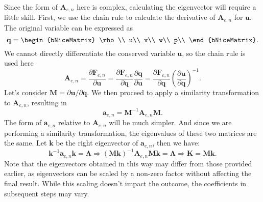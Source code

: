 \documentclass{develop-note}
\begin{document}
Since the form of $\mathbf{A}_{e,n}$ here is complex, calculating the eigenvector will require a little skill. First, we use the chain rule to calculate the derivative of $\mathbf{A}_{e,n}$ for $\mathbf{u}$. The original variable can be expressed as
\begin{equation}
  \mathbf{q}=\begin{bNiceMatrix}
    \rho\\
    u\\
    v\\
    w\\
    p\\
  \end{bNiceMatrix}.
\end{equation}
We cannot directly differentiate the conserved variable $\mathbf{u}$, so the chain rule is used here
\begin{equation}
  \mathbf{A}_{e,n}=\dfrac{\partial\mathbf{F}_{e,n}}{\partial\mathbf{u}}=\dfrac{\partial\mathbf{F}_{e,n}}{\partial\mathbf{q}}\dfrac{\partial\mathbf{q}}{\partial\mathbf{u}}=\dfrac{\partial\mathbf{F}_{e,n}}{\partial\mathbf{q}}\left(\dfrac{\partial\mathbf{u}}{\partial\mathbf{q}}\right)^{-1}.
\end{equation}
Let's consider $\mathbf{M}=\partial\mathbf{u}/\partial\mathbf{q}$. We then proceed to apply a similarity transformation to $\mathbf{A}_{e,n}$, resulting in
\begin{equation}
  \mathbf{a}_{e,n}=\mathbf{M}^{-1}\mathbf{A}_{e,n}\mathbf{M}.
\end{equation}
The form of $\mathbf{a}_{e,n}$ relative to $\mathbf{A}_{e,n}$ will be much simpler. And since we are performing a similarity transformation, the eigenvalues of these two matrices are the same. Let $\mathbf{k}$ be the right eigenvector of $\mathbf{a}_{e,n}$, then we have:
\begin{equation}
  \mathbf{k}^{-1}\mathbf{a}_{e,n}\mathbf{k}=\mathbf{\Lambda}\Rightarrow(\mathbf{M}\mathbf{k})^{-1}\mathbf{A}_{e,n}\mathbf{M}\mathbf{k}=\mathbf{\Lambda}\Rightarrow\mathbf{K}=\mathbf{M k}.
\end{equation}
Note that the eigenvectors obtained in this way may differ from those provided earlier, as eigenvectors can be scaled by a non-zero factor without affecting the final result. While this scaling doesn't impact the outcome, the coefficients in subsequent steps may vary.
\end{document}
